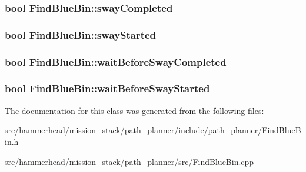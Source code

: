 \subsubsection[{\texorpdfstring{sway\+Completed}{swayCompleted}}]{\setlength{\rightskip}{0pt plus 5cm}bool Find\+Blue\+Bin\+::sway\+Completed}\hypertarget{classFindBlueBin_ab64bd6b7d53ecf879bedb985024c656c}{}\label{classFindBlueBin_ab64bd6b7d53ecf879bedb985024c656c}
\subsubsection[{\texorpdfstring{sway\+Started}{swayStarted}}]{\setlength{\rightskip}{0pt plus 5cm}bool Find\+Blue\+Bin\+::sway\+Started}\hypertarget{classFindBlueBin_aaeb71c1eb1cd445cdd9188668b53e750}{}\label{classFindBlueBin_aaeb71c1eb1cd445cdd9188668b53e750}
\subsubsection[{\texorpdfstring{wait\+Before\+Sway\+Completed}{waitBeforeSwayCompleted}}]{\setlength{\rightskip}{0pt plus 5cm}bool Find\+Blue\+Bin\+::wait\+Before\+Sway\+Completed}\hypertarget{classFindBlueBin_ad9e1037722ff8a74b3ca6a326f612f8f}{}\label{classFindBlueBin_ad9e1037722ff8a74b3ca6a326f612f8f}
\subsubsection[{\texorpdfstring{wait\+Before\+Sway\+Started}{waitBeforeSwayStarted}}]{\setlength{\rightskip}{0pt plus 5cm}bool Find\+Blue\+Bin\+::wait\+Before\+Sway\+Started}\hypertarget{classFindBlueBin_a234b002d35a26565afe53744fed13eb6}{}\label{classFindBlueBin_a234b002d35a26565afe53744fed13eb6}


The documentation for this class was generated from the following files\+:\begin{DoxyCompactItemize}
\item 
src/hammerhead/mission\+\_\+stack/path\+\_\+planner/include/path\+\_\+planner/\hyperlink{FindBlueBin_8h}{Find\+Blue\+Bin.\+h}\item 
src/hammerhead/mission\+\_\+stack/path\+\_\+planner/src/\hyperlink{FindBlueBin_8cpp}{Find\+Blue\+Bin.\+cpp}\end{DoxyCompactItemize}
